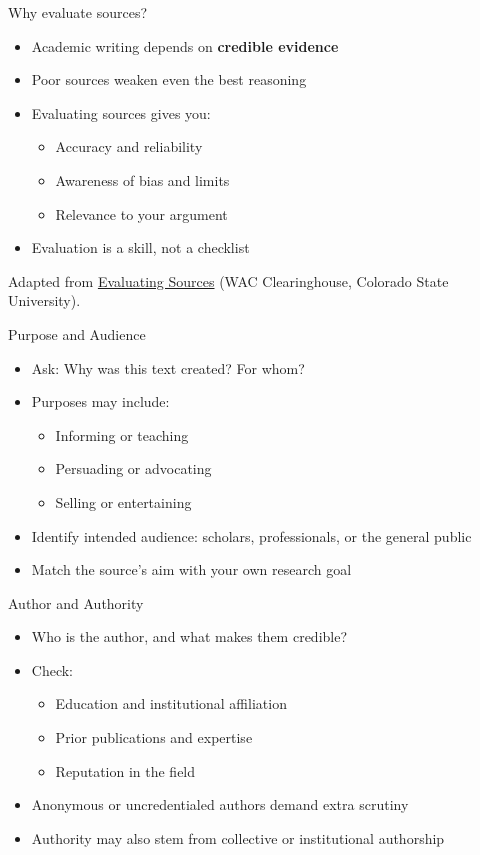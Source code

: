 \documentclass[aspectratio=169]{beamer}
\begin{document}
\begin{frame}{Why evaluate sources?}
\begin{itemize}
  \item Academic writing depends on \textbf{credible evidence}
  \item Poor sources weaken even the best reasoning
  \item Evaluating sources gives you:
    \begin{itemize}
      \item Accuracy and reliability
      \item Awareness of bias and limits
      \item Relevance to your argument
    \end{itemize}
  \item Evaluation is a skill, not a checklist
  \end{itemize}

  \vfill
 Adapted from \href{https://wac.colostate.edu/resources/writing/guides/evaluating/}{Evaluating Sources} (WAC Clearinghouse, Colorado State University).
\end{frame}

\begin{frame}{Purpose and Audience}
\begin{itemize}
  \item Ask: Why was this text created? For whom?
  \item Purposes may include:
    \begin{itemize}
      \item Informing or teaching
      \item Persuading or advocating
      \item Selling or entertaining
    \end{itemize}
  \item Identify intended audience: scholars, professionals, or the general public
  \item Match the source’s aim with your own research goal
\end{itemize}
\end{frame}

\begin{frame}{Author and Authority}
\begin{itemize}
  \item Who is the author, and what makes them credible?
  \item Check:
    \begin{itemize}
      \item Education and institutional affiliation
      \item Prior publications and expertise
      \item Reputation in the field
    \end{itemize}
  \item Anonymous or uncredentialed authors demand extra scrutiny
  \item Authority may also stem from collective or institutional authorship
\end{itemize}
\end{frame}
\end{document}
